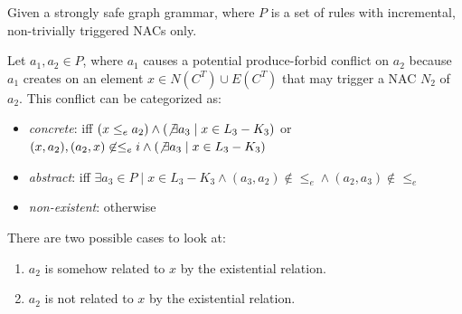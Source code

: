 \begin{definition} Given \doublyTypedGraphGrammarCore{} a strongly safe graph grammar, where $P$ is a set of rules with incremental, non-trivially triggered NACs only.

\hfill

  Let $a_1,a_2 \in P$, where $a_1$ causes a potential produce-forbid conflict on $a_2$ because $a_1$ creates on an element $x \in N(C^T) \cup E(C^T)$ that may trigger a NAC $N_2$ of $a_2$. This conflict can be categorized as:

\begin{itemize}
  \item \emph{concrete}: iff $(x \leq_e a_2) \land (\not\exists a_3 \mid x \in L_3 - K_3)$ or $(x,a_2),(a_2,x) \not\in \leq_ei \land (\not\exists a_3 \mid x \in L_3 - K_3)$
  \item \emph{abstract}: iff $\exists a_3 \in P \mid x \in L_3 - K_3 \land (a_3,a_2) \not\in \leq_e \land (a_2, a_3) \not\in \leq_e$
  \item \emph{non-existent}: otherwise
\end{itemize}

\end{definition}

  There are two possible cases to look at:

  \begin{enumerate}
    \item $a_2$ is somehow related to $x$ by the existential relation.
    \item $a_2$ is not related to $x$ by the existential relation.
  \end{enumerate}

